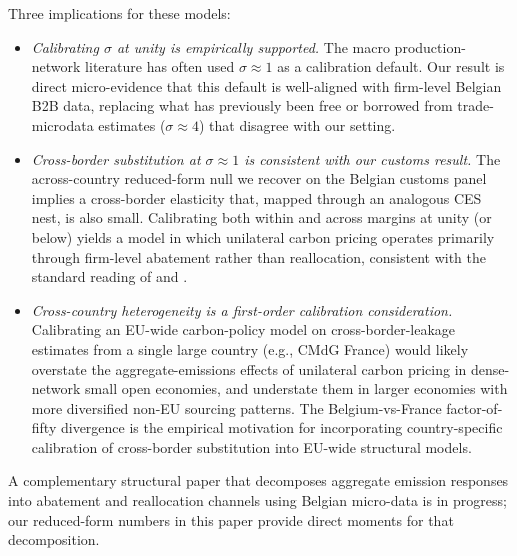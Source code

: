 Three implications for these models:

\begin{itemize}
    \item \emph{Calibrating $\sigma$ at unity is empirically supported.} The macro production-network literature has often used $\sigma \approx 1$ as a calibration default. Our result is direct micro-evidence that this default is well-aligned with firm-level Belgian B2B data, replacing what has previously been free or borrowed from trade-microdata estimates ($\sigma \approx 4$) that disagree with our setting.

    \item \emph{Cross-border substitution at $\sigma \approx 1$ is consistent with our customs result.} The across-country reduced-form null we recover on the Belgian customs panel implies a cross-border elasticity that, mapped through an analogous CES nest, is also small. Calibrating both within and across margins at unity (or below) yields a model in which unilateral carbon pricing operates primarily through firm-level abatement rather than reallocation, consistent with the standard reading of \citet{colmeretal2023} and \citet{kanzig2023unequal}.

    \item \emph{Cross-country heterogeneity is a first-order calibration consideration.} Calibrating an EU-wide carbon-policy model on cross-border-leakage estimates from a single large country (e.g., CMdG France) would likely overstate the aggregate-emissions effects of unilateral carbon pricing in dense-network small open economies, and understate them in larger economies with more diversified non-EU sourcing patterns. The Belgium-vs-France factor-of-fifty divergence is the empirical motivation for incorporating country-specific calibration of cross-border substitution into EU-wide structural models.
\end{itemize}

A complementary structural paper that decomposes aggregate emission responses into abatement and reallocation channels using Belgian micro-data is in progress; our reduced-form numbers in this paper provide direct moments for that decomposition.
